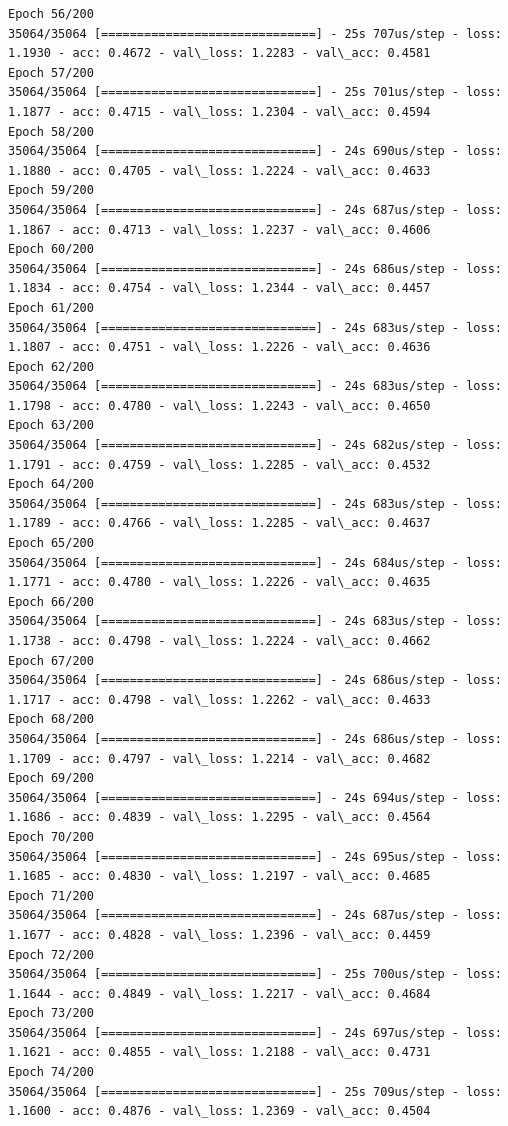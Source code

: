 \documentclass[11pt]{article}
\begin{document}
\begin{Verbatim}[commandchars=\\\{\}]
Epoch 56/200
35064/35064 [==============================] - 25s 707us/step - loss: 1.1930 - acc: 0.4672 - val\_loss: 1.2283 - val\_acc: 0.4581
Epoch 57/200
35064/35064 [==============================] - 25s 701us/step - loss: 1.1877 - acc: 0.4715 - val\_loss: 1.2304 - val\_acc: 0.4594
Epoch 58/200
35064/35064 [==============================] - 24s 690us/step - loss: 1.1880 - acc: 0.4705 - val\_loss: 1.2224 - val\_acc: 0.4633
Epoch 59/200
35064/35064 [==============================] - 24s 687us/step - loss: 1.1867 - acc: 0.4713 - val\_loss: 1.2237 - val\_acc: 0.4606
Epoch 60/200
35064/35064 [==============================] - 24s 686us/step - loss: 1.1834 - acc: 0.4754 - val\_loss: 1.2344 - val\_acc: 0.4457
Epoch 61/200
35064/35064 [==============================] - 24s 683us/step - loss: 1.1807 - acc: 0.4751 - val\_loss: 1.2226 - val\_acc: 0.4636
Epoch 62/200
35064/35064 [==============================] - 24s 683us/step - loss: 1.1798 - acc: 0.4780 - val\_loss: 1.2243 - val\_acc: 0.4650
Epoch 63/200
35064/35064 [==============================] - 24s 682us/step - loss: 1.1791 - acc: 0.4759 - val\_loss: 1.2285 - val\_acc: 0.4532
Epoch 64/200
35064/35064 [==============================] - 24s 683us/step - loss: 1.1789 - acc: 0.4766 - val\_loss: 1.2285 - val\_acc: 0.4637
Epoch 65/200
35064/35064 [==============================] - 24s 684us/step - loss: 1.1771 - acc: 0.4780 - val\_loss: 1.2226 - val\_acc: 0.4635
Epoch 66/200
35064/35064 [==============================] - 24s 683us/step - loss: 1.1738 - acc: 0.4798 - val\_loss: 1.2224 - val\_acc: 0.4662
Epoch 67/200
35064/35064 [==============================] - 24s 686us/step - loss: 1.1717 - acc: 0.4798 - val\_loss: 1.2262 - val\_acc: 0.4633
Epoch 68/200
35064/35064 [==============================] - 24s 686us/step - loss: 1.1709 - acc: 0.4797 - val\_loss: 1.2214 - val\_acc: 0.4682
Epoch 69/200
35064/35064 [==============================] - 24s 694us/step - loss: 1.1686 - acc: 0.4839 - val\_loss: 1.2295 - val\_acc: 0.4564
Epoch 70/200
35064/35064 [==============================] - 24s 695us/step - loss: 1.1685 - acc: 0.4830 - val\_loss: 1.2197 - val\_acc: 0.4685
Epoch 71/200
35064/35064 [==============================] - 24s 687us/step - loss: 1.1677 - acc: 0.4828 - val\_loss: 1.2396 - val\_acc: 0.4459
Epoch 72/200
35064/35064 [==============================] - 25s 700us/step - loss: 1.1644 - acc: 0.4849 - val\_loss: 1.2217 - val\_acc: 0.4684
Epoch 73/200
35064/35064 [==============================] - 24s 697us/step - loss: 1.1621 - acc: 0.4855 - val\_loss: 1.2188 - val\_acc: 0.4731
Epoch 74/200
35064/35064 [==============================] - 25s 709us/step - loss: 1.1600 - acc: 0.4876 - val\_loss: 1.2369 - val\_acc: 0.4504

\end{Verbatim}
\end{document}

